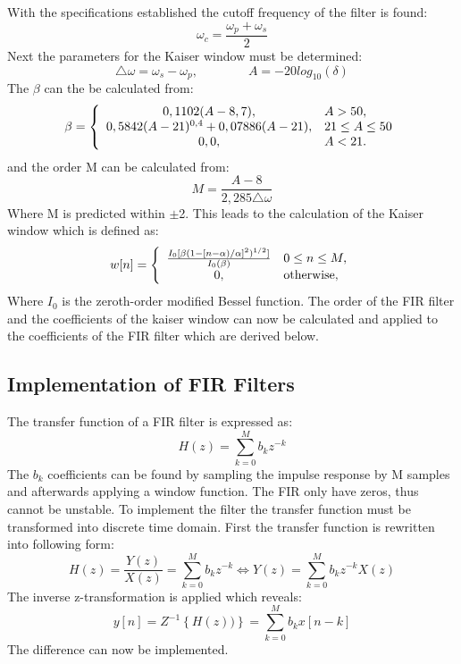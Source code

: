 With the specifications established the cutoff frequency of the filter is found:
\begin{equation}
\omega_c=\frac{\omega_p+\omega_s}{2}
\end{equation}
Next the parameters for the Kaiser window must be determined:
\begin{equation}
\triangle\omega = \omega_s-\omega_p, \qquad\qquad A=-20log_{10}(\delta)
\end{equation}
The $\beta$ can the be calculated from:
\begin{equation} \label{eq:beta}
\beta=\left\{
\begin{array}{c l}      
    0,1102(A-8,7), & A>50,\\
    0,5842(A-21)^{0,4}+0,07886(A-21), & 21\leq A\leq 50\\
    0,0, & A<21.
\end{array}\right.
\end{equation}
and the order M can be calculated from:
\begin{equation}
M=\frac{A-8}{2,285\triangle\omega}
\end{equation}
Where M is predicted within $\pm$2. This leads to the calculation of the Kaiser window which is defined as:
\begin{equation} \label{eq:kaiserwindow}
w[n]=\left\{
\begin{array}{c l}      
    \frac{I_0[\beta(1-[n-\alpha)/\alpha]^2)^{1/2}]}{I_0(\beta)} & 0\leq n\leq M,\\
    0, & \textrm{otherwise},
\end{array}\right.
\end{equation}
Where $I_0$ is the zeroth-order modified Bessel function. The order of the FIR filter and the coefficients of the kaiser window can now be calculated and applied to the coefficients of the FIR filter which are derived below.

\subsection*{Implementation of FIR Filters}

The transfer function of a FIR filter is expressed as:
\begin{equation}
H(z) = \sum_{k=0}^{M} b_k z^{-k}
\end{equation}
The $b_k$ coefficients can be found by sampling the impulse response by M samples and afterwards applying a window function. The FIR only have zeros, thus cannot be unstable. To implement the filter the transfer function must be transformed into discrete time domain. First the transfer function is rewritten into following form:
\begin{equation}
H(z) = \frac{Y(z)}{X(z)} = \sum_{k=0}^{M} b_k z^{-k} \Leftrightarrow Y(z) = \sum_{k=0}^{M} b_k z^{-k} X(z) 
\end{equation}
The inverse z-transformation is applied which reveals:
\begin{equation}
y[n] = Z^{-1} \left\lbrace H(z)) \right\rbrace =\sum_{k=0}^{M} b_k x[n-k]
\end{equation}
The difference can now be implemented.



